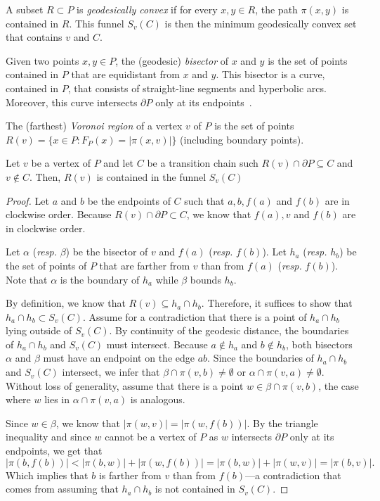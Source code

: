 \documentclass[a4paper,UKenglish]{lipics}
\newcommand{\F}[2]{\ensuremath{F_{\scriptscriptstyle #1}(#2)}}
\newcommand{\fn}[2]{\ensuremath{S_{\scriptscriptstyle #1}(#2)}}
\newcommand{\ff}[1]{\ensuremath{f(#1)}}
\newcommand{\g}[2]{\ensuremath{|\pi(#1, #2)|}}
\newcommand{\p}[2]{\ensuremath{\pi(#1, #2)}}
\begin{document}
A subset $R\subset P$ is \emph{geodesically convex} if for every $x,y\in R$, the path $\p{x}{y}$ is contained in $R$.
This funnel $\fn{v}{C}$ is then the minimum geodesically convex set that contains $v$ and $C$.

Given two points $x,y\in P$, the (geodesic) \emph{bisector} of $x$ and $y$ is the set of points contained in $P$ that are equidistant from $x$ and $y$. This bisector is a curve, contained in $P$, that consists of straight-line segments and hyperbolic arcs. Moreover, this curve intersects $\partial P$ only at its endpoints~\cite[Lemma 3.22]{aronov1989geodesic}.

The (farthest) \emph{Voronoi region} of a vertex $v$ of $P$ is the set of points $R(v) = \{x\in P : \F{P}{x} = \g{x}{v}\}$ (including boundary points).

\begin{lemma}\label{lemma:Funnel contains Voronoi region}
Let $v$ be a vertex of $P$ and let $C$ be a transition chain such $R(v)\cap \partial P \subseteq C$ and $v\not\in C$.
Then, $R(v)$ is contained in the funnel $\fn{v}{C}$
\end{lemma}
\begin{proof}
Let $a$ and $b$ be the endpoints of $C$ such that $a,b, \ff{a}$ and $\ff{b}$ are in clockwise order.
Because $R(v)\cap \partial P\subset C$, we know that $\ff{a}, v$ and $\ff{b}$ are in clockwise order.

Let $\alpha$ (\emph{resp.} $\beta$) be the bisector of $v$ and $\ff{a}$ (\emph{resp.} $\ff{b}$).
Let $h_a$ (\emph{resp.} $h_b$) be the set of points of $P$ that are farther from $v$ than from $\ff{a}$ (\emph{resp.} $\ff{b}$).
Note that $\alpha$ is the boundary of $h_a$ while $\beta$ bounds $h_b$.

By definition, we know that $R(v)\subseteq h_a\cap h_b$. Therefore, it suffices to show that $h_a\cap h_b\subset \fn{v}{C}$.
Assume for a contradiction that there is a point of $h_a\cap h_b$ lying outside of $\fn{v}{C}$. 
By continuity of the geodesic distance, the boundaries of $h_a\cap h_b$ and $\fn{v}{C}$ must intersect.
Because $a\notin h_a$ and $b\notin h_b$, both bisectors $\alpha$ and $\beta$ must have an endpoint on the edge $ab$.
Since the boundaries of $h_a\cap h_b$ and $\fn{v}{C}$ intersect, we infer that $\beta \cap \p{v}{b}\neq \emptyset$ or $\alpha \cap \p{v}{a}\neq \emptyset$.
Without loss of generality, assume that there is a point $w\in \beta \cap \p{v}{b}$, the case where $w$ lies in $\alpha \cap \p{v}{a}$ is analogous. 

Since $w\in \beta$, we know that $\g{w}{v} = \g{w}{ \ff{b}}$. By the triangle inequality and since $w$ cannot be a vertex of $P$ as $w$ intersects $\partial P$ only at its endpoints, we get that
$$\g{b}{\ff{b}} < \g{b}{w} + \g{w}{\ff{b}} = \g{b}{w} + \g{w}{v} = \g{b}{v}.$$
Which implies that $b$ is farther from $v$ than from $\ff{b}$---a contradiction that comes from assuming that $h_a\cap h_b$ is not contained in $\fn{v}{C}$.
\end{proof}
\end{document}
